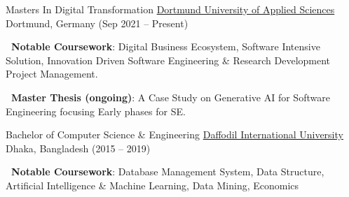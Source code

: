 \documentclass[]{awesome-cv}
\begin{document}
\vspace{-7mm}


\begin{cventries}
	\cventry
	{Masters In Digital Transformation}
	{\href{https://www.fh-dortmund.de/en/programs/digital-transformation-master.php}{Dortmund University of Applied Sciences}}
	{}
	{Dortmund, Germany (Sep 2021 – Present)}
	{\begin{cvitems}
	    \item \textbf{~{}Notable Coursework}: Digital Business Ecosystem, Software Intensive Solution, Innovation Driven Software Engineering \& Research Development Project Management.
	    \item \textbf{~{}Master Thesis (ongoing)}: A Case Study on Generative AI for Software Engineering focusing Early phases for SE.
	\end{cvitems}}
	\cventry
	{Bachelor of Computer Science \& Engineering}
	{\href{https://www.fh-dortmund.de/en/programs/digital-transformation-master.php}{Daffodil International University}}
	{}
	{Dhaka, Bangladesh (2015 –  2019)}
	{\begin{cvitems}
	    \item  \textbf{~{}Notable Coursework}: Database Management System, Data Structure, Artificial Intelligence \& Machine Learning, Data Mining, Economics
	\end{cvitems}}
\end{cventries}
\end{document}
